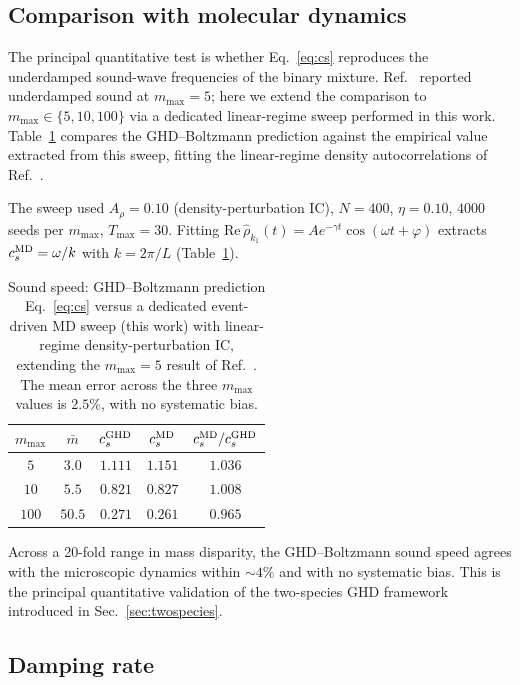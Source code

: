 \documentclass[aps,pre,twocolumn,superscriptaddress,longbibliography,floatfix]{revtex4-2}
\begin{document}
\subsection{Comparison with molecular dynamics}

The principal quantitative test is whether
Eq.~\eqref{eq:cs} reproduces the underdamped sound-wave
frequencies of the binary mixture. Ref.~\cite{PaperII} reported
underdamped sound at $m_{\max}=5$; here we extend the
comparison to $m_{\max}\in\{5,10,100\}$ via a dedicated
linear-regime sweep performed in this work.
Table~\ref{tab:cs} compares the GHD--Boltzmann prediction
against the empirical value extracted from this sweep, fitting
the linear-regime
density autocorrelations of Ref.~\cite{PaperII}.

The sweep used $A_\rho=0.10$ (density-perturbation IC), $N=400$,
$\eta=0.10$, $4000$ seeds per $m_{\max}$, $T_{\max}=30$. Fitting
$\mathrm{Re}\,\hat\rho_{k_1}(t) = A e^{-\gamma t}\cos(\omega t
+\varphi)$ extracts $c_s^{\rm MD}=\omega/k$ with $k=2\pi/L$
(Table~\ref{tab:cs}).

\begin{table}[t]
\centering
\caption{Sound speed: GHD--Boltzmann prediction
Eq.~\eqref{eq:cs} versus a dedicated event-driven MD sweep
(this work) with linear-regime density-perturbation IC,
extending the $m_{\max}=5$ result of Ref.~\cite{PaperII}. The
mean error across the three $m_{\max}$ values is $2.5\%$, with
no systematic bias.}
\label{tab:cs}
\begin{tabular}{ccccc}
\hline\hline
$m_{\max}$ & $\bar m$ & $c_s^{\rm GHD}$
                       & $c_s^{\rm MD}$
                       & $c_s^{\rm MD}/c_s^{\rm GHD}$\\
\hline
$5$   & $3.0$  & $1.111$ & $1.151$ & $1.036$\\
$10$  & $5.5$  & $0.821$ & $0.827$ & $1.008$\\
$100$ & $50.5$ & $0.271$ & $0.261$ & $0.965$\\
\hline\hline
\end{tabular}
\end{table}

Across a 20-fold range in mass disparity, the GHD--Boltzmann
sound speed agrees with the microscopic dynamics within
$\sim 4\%$ and with no systematic bias. This is the principal
quantitative validation of the two-species GHD framework
introduced in Sec.~\ref{sec:twospecies}.

\subsection{Damping rate}\label{sec:damping}
\end{document}
